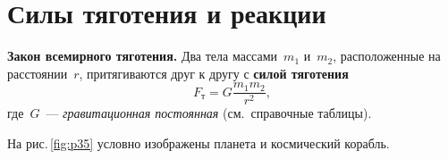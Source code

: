 \documentclass[main.tex]{subfiles}
\begin{document}



 

 

\setcounter{section}{18
}
\addtocounter{section}{-1} 

\section{Силы тяготения и реакции}


\begin{law}
\textbf{Закон всемирного тяготения.} Два тела массами~$m_1$ и~$m_2$, расположенные на расстоянии~$r$, притягиваются
друг к другу с \textbf{силой тяготения}
\begin{equation}
    \label{26grav_e1}
    F_\text{т}=G\dfrac{m_1m_2}{r^2},
\end{equation}
где~$G$~--- \emph{гравитационная постоянная} (см.~справочные таблицы). 
\end{law}

На рис.\,\ref{fig:p35} условно изображены планета и космический корабль.
\end{document}
